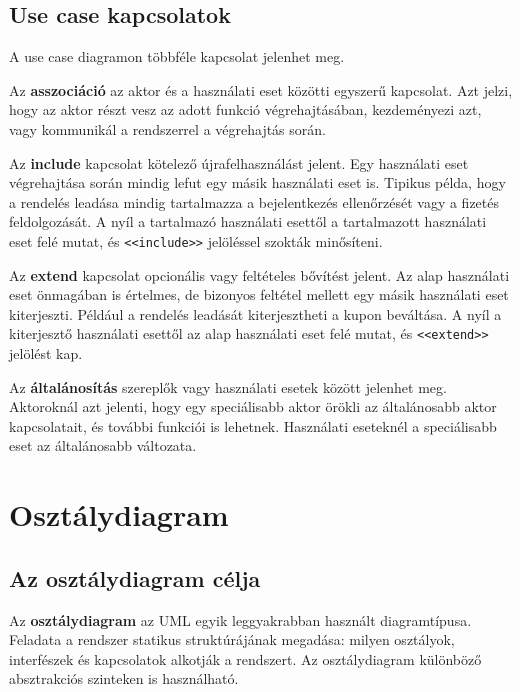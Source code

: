 \subsection{Use case kapcsolatok}

A use case diagramon többféle kapcsolat jelenhet meg.

Az \textbf{asszociáció} az aktor és a használati eset közötti egyszerű kapcsolat. Azt jelzi, hogy az aktor részt vesz az adott funkció végrehajtásában, kezdeményezi azt, vagy kommunikál a rendszerrel a végrehajtás során.

Az \textbf{include} kapcsolat kötelező újrafelhasználást jelent. Egy használati eset végrehajtása során mindig lefut egy másik használati eset is. Tipikus példa, hogy a rendelés leadása mindig tartalmazza a bejelentkezés ellenőrzését vagy a fizetés feldolgozását. A nyíl a tartalmazó használati esettől a tartalmazott használati eset felé mutat, és \texttt{\textless\textless{}include\textgreater\textgreater{}} jelöléssel szokták minősíteni.

Az \textbf{extend} kapcsolat opcionális vagy feltételes bővítést jelent. Az alap használati eset önmagában is értelmes, de bizonyos feltétel mellett egy másik használati eset kiterjeszti. Például a rendelés leadását kiterjesztheti a kupon beváltása. A nyíl a kiterjesztő használati esettől az alap használati eset felé mutat, és \texttt{\textless\textless{}extend\textgreater\textgreater{}} jelölést kap.

Az \textbf{általánosítás} szereplők vagy használati esetek között jelenhet meg. Aktoroknál azt jelenti, hogy egy speciálisabb aktor örökli az általánosabb aktor kapcsolatait, és további funkciói is lehetnek. Használati eseteknél a speciálisabb eset az általánosabb változata.

\section{Osztálydiagram}

\subsection{Az osztálydiagram célja}

Az \textbf{osztálydiagram} az UML egyik leggyakrabban használt diagramtípusa. Feladata a rendszer statikus struktúrájának megadása: milyen osztályok, interfészek és kapcsolatok alkotják a rendszert. Az osztálydiagram különböző absztrakciós szinteken is használható.

